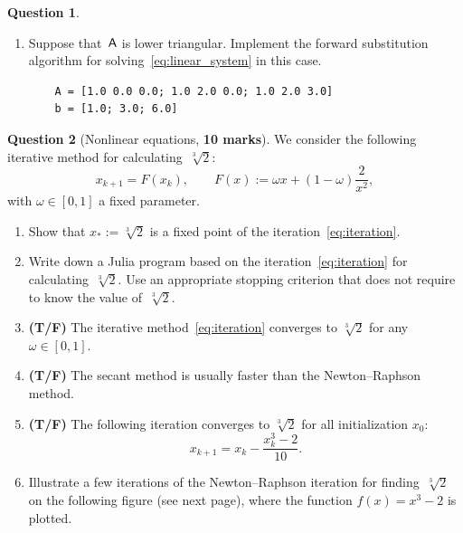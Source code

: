 \documentclass[10pt]{article}
\theoremstyle{definition}
\newtheorem{question}{Question}
\theoremstyle{remark}
\theoremstyle{plain}%
\begin{document}
\begin{question}
\begin{enumerate}
        \item
            Suppose that~$\mathsf A$ is lower triangular.
            Implement the forward substitution algorithm for solving~\eqref{eq:linear_system} in this case.
            \begin{verbatim}
    A = [1.0 0.0 0.0; 1.0 2.0 0.0; 1.0 2.0 3.0]
    b = [1.0; 3.0; 6.0]
            \end{verbatim}
    \end{enumerate}
\end{question}

\newpage
\begin{question}
    [Nonlinear equations, \textbf{10 marks}]
    We consider the following iterative method for calculating~$\sqrt[3]{2}$:
    \begin{equation}
        \label{eq:iteration}
        x_{k+1} = F(x_k), \qquad F(x) :=  \omega x + (1 - \omega) \frac{2}{x^2},
    \end{equation}
    with $\omega \in [0, 1]$ a fixed parameter.
    \begin{enumerate}
        \item
            Show that $x_* := \sqrt[3]{2}$ is a fixed point of the iteration~\eqref{eq:iteration}.
            \vspace{2cm}

        \item
            Write down a Julia program based on the iteration~\eqref{eq:iteration} for calculating~$\sqrt[3]{2}$.
            Use an appropriate stopping criterion that does not require to know the value of~$\sqrt[3]{2}$.
            \vspace{5cm}


        \item
            \textbf{(T/F)}
            The iterative method~\eqref{eq:iteration} converges to $\sqrt[3]{2}$ for any $\omega \in [0, 1]$.

        \item
            \textbf{(T/F)}
            The secant method is usually faster than the Newton--Raphson method.

        \item
            \textbf{(T/F)}
            The following iteration converges to $\sqrt[3]{2}$ for all initialization $x_0$:
            \[
                x_{k+1} = x_k - \frac{x_k^3 - 2}{10}.
            \]

        \item
            \mymark{}
            Illustrate a few iterations of the Newton--Raphson iteration for finding~$\sqrt[3]{2}$ on the following figure (see next page),
            where the function $f(x) = x^3 - 2$ is plotted.
    \end{enumerate}
\end{question}
\end{document}
